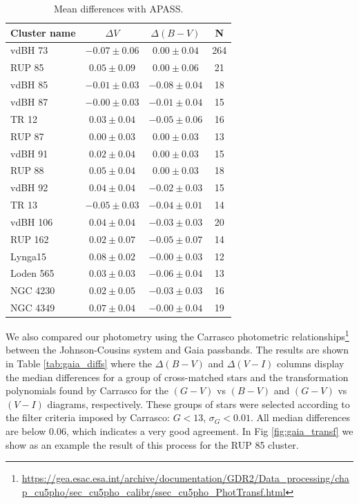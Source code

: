 \documentclass[draft]{aa}
\begin{document}
\begin{table}[ht]
    \centering
    \begin{tabular}{lccc}
    \hline
    Cluster name & $\Delta V$ & $\Delta (B-V)$ & N \\
    \hline \hline
    vdBH 73 & $-0.07\pm0.06$ & $0.00\pm0.04$ & 264\\
    RUP 85 & $0.05\pm0.09$ & $0.00\pm0.06$ & 21\\
    vdBH 85 & $-0.01\pm0.03$ & $-0.08\pm0.04$ & 18\\
    vdBH 87 & $-0.00\pm0.03$ & $-0.01\pm0.04$ & 15\\
    TR 12 & $0.03\pm0.04$ & $-0.05\pm0.06$ & 16\\
    RUP 87 & $0.00\pm0.03$ & $0.00\pm0.03$ & 13\\
    vdBH 91 & $0.02\pm0.04$ & $0.00\pm0.03$ & 15\\
    RUP 88 & $0.05\pm0.04$ & $0.00\pm0.03$ & 18\\
    vdBH 92 & $0.04\pm0.04$ & $-0.02\pm0.03$ & 15\\
    TR 13 & $-0.05\pm0.03$ & $-0.04\pm0.01$ & 14\\
    vdBH 106 & $0.04\pm0.04$ & $-0.03\pm0.03$ & 20\\
    RUP 162 & $0.02\pm0.07$ & $-0.05\pm0.07$ & 14\\
    Lynga15 & $0.08\pm0.02$ & $-0.00\pm0.03$ & 12\\
    Loden 565 & $0.03\pm0.03$ & $-0.06\pm0.04$ & 13\\
    NGC 4230 & $0.02\pm0.05$ & $-0.03\pm0.03$ & 16\\
    NGC 4349 & $0.07\pm0.04$ & $-0.00\pm0.04$ & 19\\
    \hline
    \end{tabular}
    \caption{Mean differences with APASS.}
    \label{tab:apass_diffs}
\end{table}

We also compared our photometry using the Carrasco photometric
relationships\footnote{\url{https://gea.esac.esa.int/archive/documentation/GDR2/Data_processing/chap_cu5pho/sec_cu5pho_calibr/ssec_cu5pho_PhotTransf.html}}
between the Johnson-Cousins system and Gaia passbands. The results are shown in
Table \ref{tab:gaia_diffs} where the $\Delta (B-V)$ and $\Delta (V-I)$ columns
display the median differences for a group of cross-matched stars and the
transformation polynomials found by Carrasco for the $(G-V)$ vs $(B-V)$ and
$(G-V)$ vs $(V-I)$ diagrams, respectively. These groups of stars were selected
according to the  filter criteria imposed by Carrasco: $G<13$,
$\sigma_{G}<0.01$. All median differences are below 0.06, which indicates a
very good agreement.
In Fig \ref{fig:gaia_transf} we show as an example the result of this process
for the RUP 85 cluster.\\
\end{document}
